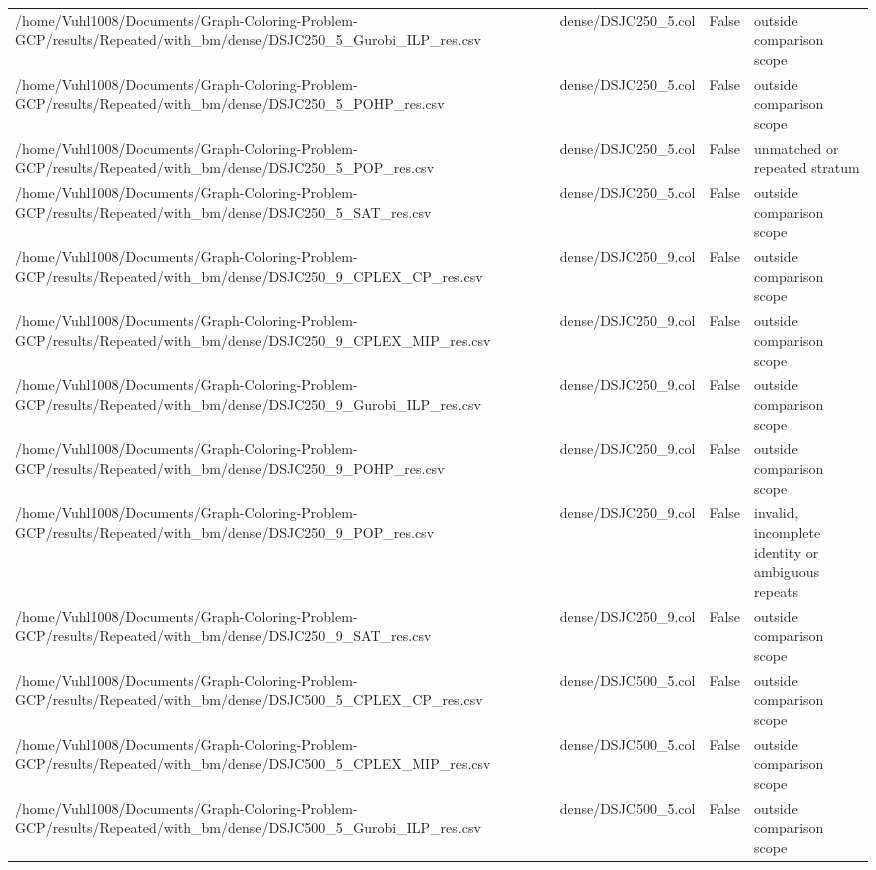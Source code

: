 \begin{table}[htbp]
\begin{tabular}{llll}
/home/Vuhl1008/Documents/Graph-Coloring-Problem-GCP/results/Repeated/with\_bm/dense/DSJC250\_5\_Gurobi\_ILP\_res.csv & dense/DSJC250\_5.col & False & outside comparison scope \\
/home/Vuhl1008/Documents/Graph-Coloring-Problem-GCP/results/Repeated/with\_bm/dense/DSJC250\_5\_POHP\_res.csv & dense/DSJC250\_5.col & False & outside comparison scope \\
/home/Vuhl1008/Documents/Graph-Coloring-Problem-GCP/results/Repeated/with\_bm/dense/DSJC250\_5\_POP\_res.csv & dense/DSJC250\_5.col & False & unmatched or repeated stratum \\
/home/Vuhl1008/Documents/Graph-Coloring-Problem-GCP/results/Repeated/with\_bm/dense/DSJC250\_5\_SAT\_res.csv & dense/DSJC250\_5.col & False & outside comparison scope \\
/home/Vuhl1008/Documents/Graph-Coloring-Problem-GCP/results/Repeated/with\_bm/dense/DSJC250\_9\_CPLEX\_CP\_res.csv & dense/DSJC250\_9.col & False & outside comparison scope \\
/home/Vuhl1008/Documents/Graph-Coloring-Problem-GCP/results/Repeated/with\_bm/dense/DSJC250\_9\_CPLEX\_MIP\_res.csv & dense/DSJC250\_9.col & False & outside comparison scope \\
/home/Vuhl1008/Documents/Graph-Coloring-Problem-GCP/results/Repeated/with\_bm/dense/DSJC250\_9\_Gurobi\_ILP\_res.csv & dense/DSJC250\_9.col & False & outside comparison scope \\
/home/Vuhl1008/Documents/Graph-Coloring-Problem-GCP/results/Repeated/with\_bm/dense/DSJC250\_9\_POHP\_res.csv & dense/DSJC250\_9.col & False & outside comparison scope \\
/home/Vuhl1008/Documents/Graph-Coloring-Problem-GCP/results/Repeated/with\_bm/dense/DSJC250\_9\_POP\_res.csv & dense/DSJC250\_9.col & False & invalid, incomplete identity or ambiguous repeats \\
/home/Vuhl1008/Documents/Graph-Coloring-Problem-GCP/results/Repeated/with\_bm/dense/DSJC250\_9\_SAT\_res.csv & dense/DSJC250\_9.col & False & outside comparison scope \\
/home/Vuhl1008/Documents/Graph-Coloring-Problem-GCP/results/Repeated/with\_bm/dense/DSJC500\_5\_CPLEX\_CP\_res.csv & dense/DSJC500\_5.col & False & outside comparison scope \\
/home/Vuhl1008/Documents/Graph-Coloring-Problem-GCP/results/Repeated/with\_bm/dense/DSJC500\_5\_CPLEX\_MIP\_res.csv & dense/DSJC500\_5.col & False & outside comparison scope \\
/home/Vuhl1008/Documents/Graph-Coloring-Problem-GCP/results/Repeated/with\_bm/dense/DSJC500\_5\_Gurobi\_ILP\_res.csv & dense/DSJC500\_5.col & False & outside comparison scope \\

\end{tabular}
\end{table}
